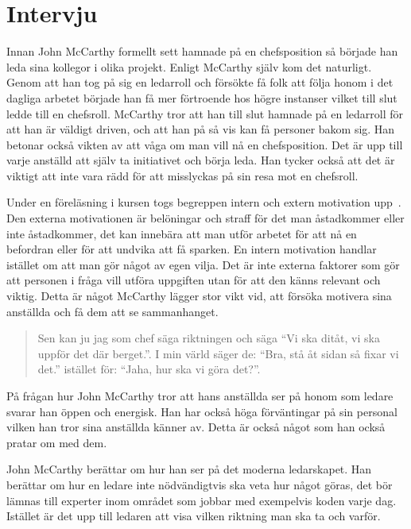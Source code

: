 \section{Intervju}
\label{sec:intervju}

Innan John McCarthy formellt sett hamnade på en chefsposition så började han leda sina kollegor i olika projekt. Enligt McCarthy själv kom det naturligt. Genom att han tog på sig en ledarroll och försökte få folk att följa honom i det dagliga arbetet började han få mer förtroende hos högre instanser vilket till slut ledde till en chefsroll. McCarthy tror att han till slut hamnade på en ledarroll för att han är väldigt driven, och att han på så vis kan få personer bakom sig. Han betonar också vikten av att våga om man vill nå en chefsposition. Det är upp till varje anställd att själv ta initiativet och börja leda. Han tycker också att det är viktigt att inte vara rädd för att misslyckas på sin resa mot en chefsroll.

Under en föreläsning i kursen togs begreppen intern och extern motivation upp~\citep{motivation}. Den externa motivationen är belöningar och straff för det man åstadkommer eller inte åstadkommer, det kan innebära att man utför arbetet för att nå en befordran eller för att undvika att få sparken. En intern motivation handlar istället om att man gör något av egen vilja. Det är inte externa faktorer som gör att personen i fråga vill utföra uppgiften utan för att den känns relevant och viktig. Detta är något McCarthy lägger stor vikt vid, att försöka motivera sina anställda och få dem att se sammanhanget.

\begin{quote}
 Sen kan ju jag som chef säga riktningen och säga ``Vi ska ditåt, vi ska uppför det där berget.''. I min värld säger de: ``Bra, stå åt sidan så fixar vi det.'' istället för: ``Jaha, hur ska vi göra det?''.
\end{quote}

På frågan hur John McCarthy tror att hans anställda ser på honom som ledare svarar han öppen och energisk. Han har också höga förväntingar på sin personal vilken han tror sina anställda känner av. Detta är också något som han också pratar om med dem.

John McCarthy berättar om hur han ser på det moderna ledarskapet. Han berättar om hur en ledare inte nödvändigtvis ska veta hur något göras, det bör lämnas till experter inom området som jobbar med exempelvis koden varje dag. Istället är det upp till ledaren att  visa vilken riktning man ska ta och varför.

